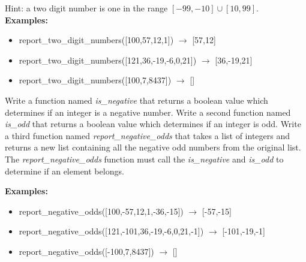 		Hint: a two digit number is one in the range $[-99,-10]\cup[10,99]$.\\
		\textbf{Examples:}		
		\begin{itemize}
			\item report\_two\_digit\_numbers([100,57,12,1]) $\rightarrow$ [57,12]
			\item report\_two\_digit\_numbers([121,36,-19,-6,0,21]) $\rightarrow$ [36,-19,21]
			\item report\_two\_digit\_numbers([100,7,8437]) $\rightarrow$ []
		\end{itemize}



	\item 
		Write a function named \textit{is\_negative} that returns a boolean value which determines 
		if an integer is a negative number. 
		Write a second function named \textit{is\_odd} that returns a boolean value which determines 
		if an integer is odd.
		Write a third function named \textit{report\_negative\_odds} that takes a list of integers 
		and returns a new list containing all the negative odd numbers from the original list. 
		The \textit{report\_negative\_odds} function must call the \textit{is\_negative} and 
		\textit{is\_odd} to	determine if an element belongs.
		
		\textbf{Examples:}		
		\begin{itemize}
			\item report\_negative\_odds([100,-57,12,1,-36,-15]) $\rightarrow$ [-57,-15]
			\item report\_negative\_odds([121,-101,36,-19,-6,0,21,-1]) $\rightarrow$ [-101,-19,-1]
			\item report\_negative\_odds([-100,7,8437]) $\rightarrow$ []
		\end{itemize}





